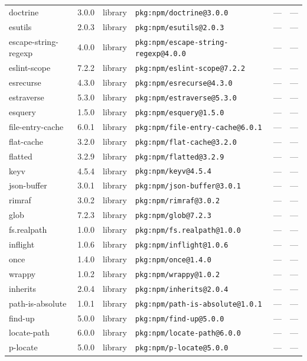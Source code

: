 \documentclass[11pt]{article}
\begin{document}
\begin{longtable}{|l|l|l|p{2.2cm}|l|p{4cm}|}
doctrine & 3.0.0 & library & \texttt{pkg:npm/doctrine@3.0.0} & — & — \\
esutils & 2.0.3 & library & \texttt{pkg:npm/esutils@2.0.3} & — & — \\
escape-string-regexp & 4.0.0 & library & \texttt{pkg:npm/escape-string-regexp@4.0.0} & — & — \\
eslint-scope & 7.2.2 & library & \texttt{pkg:npm/eslint-scope@7.2.2} & — & — \\
esrecurse & 4.3.0 & library & \texttt{pkg:npm/esrecurse@4.3.0} & — & — \\
estraverse & 5.3.0 & library & \texttt{pkg:npm/estraverse@5.3.0} & — & — \\
esquery & 1.5.0 & library & \texttt{pkg:npm/esquery@1.5.0} & — & — \\
file-entry-cache & 6.0.1 & library & \texttt{pkg:npm/file-entry-cache@6.0.1} & — & — \\
flat-cache & 3.2.0 & library & \texttt{pkg:npm/flat-cache@3.2.0} & — & — \\
flatted & 3.2.9 & library & \texttt{pkg:npm/flatted@3.2.9} & — & — \\
keyv & 4.5.4 & library & \texttt{pkg:npm/keyv@4.5.4} & — & — \\
json-buffer & 3.0.1 & library & \texttt{pkg:npm/json-buffer@3.0.1} & — & — \\
rimraf & 3.0.2 & library & \texttt{pkg:npm/rimraf@3.0.2} & — & — \\
glob & 7.2.3 & library & \texttt{pkg:npm/glob@7.2.3} & — & — \\
fs.realpath & 1.0.0 & library & \texttt{pkg:npm/fs.realpath@1.0.0} & — & — \\
inflight & 1.0.6 & library & \texttt{pkg:npm/inflight@1.0.6} & — & — \\
once & 1.4.0 & library & \texttt{pkg:npm/once@1.4.0} & — & — \\
wrappy & 1.0.2 & library & \texttt{pkg:npm/wrappy@1.0.2} & — & — \\
inherits & 2.0.4 & library & \texttt{pkg:npm/inherits@2.0.4} & — & — \\
path-is-absolute & 1.0.1 & library & \texttt{pkg:npm/path-is-absolute@1.0.1} & — & — \\
find-up & 5.0.0 & library & \texttt{pkg:npm/find-up@5.0.0} & — & — \\
locate-path & 6.0.0 & library & \texttt{pkg:npm/locate-path@6.0.0} & — & — \\
p-locate & 5.0.0 & library & \texttt{pkg:npm/p-locate@5.0.0} & — & — \\

\end{longtable}
\end{document}
